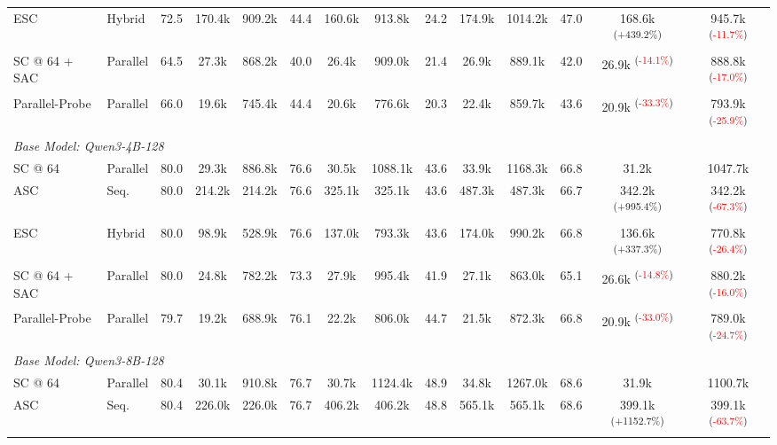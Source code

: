 \begin{table}[t]
\begin{adjustbox}{width=\textwidth}
\begin{tabular}{l l ccc ccc ccc ccc}
ESC & Hybrid & 72.5 & 170.4k & 909.2k & 44.4 & 160.6k & 913.8k & 24.2 & 174.9k & 1014.2k & 47.0 & 168.6k \textsuperscript{\scriptsize(\textcolor{green!80!black}{+439.2\%})} & 945.7k \textsuperscript{\scriptsize(\textcolor{red}{-11.7\%})} \\
SC @ 64 + SAC & Parallel & 64.5 & 27.3k & 868.2k & 40.0 & 26.4k & 909.0k & 21.4 & 26.9k & 889.1k & 42.0 & 26.9k \textsuperscript{\scriptsize(\textcolor{red}{-14.1\%})} & 888.8k \textsuperscript{\scriptsize(\textcolor{red}{-17.0\%})} \\
Parallel-Probe & Parallel & 66.0 & 19.6k & 745.4k & 44.4 & 20.6k & 776.6k & 20.3 & 22.4k & 859.7k & 43.6 & 20.9k \textsuperscript{\scriptsize(\textcolor{red}{-33.3\%})} & 793.9k \textsuperscript{\scriptsize(\textcolor{red}{-25.9\%})} \\
\midrule
\multicolumn{14}{l}{\textit{Base Model: Qwen3-4B-128}} \\
\midrule
SC @ 64 & Parallel & 80.0 & 29.3k & 886.8k & 76.6 & 30.5k & 1088.1k & 43.6 & 33.9k & 1168.3k & 66.8 & 31.2k  & 1047.7k  \\
ASC & Seq. & 80.0 & 214.2k & 214.2k & 76.6 & 325.1k & 325.1k & 43.6 & 487.3k & 487.3k & 66.7 & 342.2k \textsuperscript{\scriptsize(\textcolor{green!80!black}{+995.4\%})} & 342.2k \textsuperscript{\scriptsize(\textcolor{red}{-67.3\%})} \\
ESC & Hybrid & 80.0 & 98.9k & 528.9k & 76.6 & 137.0k & 793.3k & 43.6 & 174.0k & 990.2k & 66.8 & 136.6k \textsuperscript{\scriptsize(\textcolor{green!80!black}{+337.3\%})} & 770.8k \textsuperscript{\scriptsize(\textcolor{red}{-26.4\%})} \\
SC @ 64 + SAC & Parallel & 80.0 & 24.8k & 782.2k & 73.3 & 27.9k & 995.4k & 41.9 & 27.1k & 863.0k & 65.1 & 26.6k \textsuperscript{\scriptsize(\textcolor{red}{-14.8\%})} & 880.2k \textsuperscript{\scriptsize(\textcolor{red}{-16.0\%})} \\
Parallel-Probe & Parallel & 79.7 & 19.2k & 688.9k & 76.1 & 22.2k & 806.0k & 44.7 & 21.5k & 872.3k & 66.8 & 20.9k \textsuperscript{\scriptsize(\textcolor{red}{-33.0\%})} & 789.0k \textsuperscript{\scriptsize(\textcolor{red}{-24.7\%})} \\
\midrule
\multicolumn{14}{l}{\textit{Base Model: Qwen3-8B-128}} \\
\midrule
SC @ 64 & Parallel & 80.4 & 30.1k & 910.8k & 76.7 & 30.7k & 1124.4k & 48.9 & 34.8k & 1267.0k & 68.6 & 31.9k  & 1100.7k  \\
ASC & Seq. & 80.4 & 226.0k & 226.0k & 76.7 & 406.2k & 406.2k & 48.8 & 565.1k & 565.1k & 68.6 & 399.1k \textsuperscript{\scriptsize(\textcolor{green!80!black}{+1152.7\%})} & 399.1k \textsuperscript{\scriptsize(\textcolor{red}{-63.7\%})} \\

\end{tabular}
\end{adjustbox}
\end{table}
